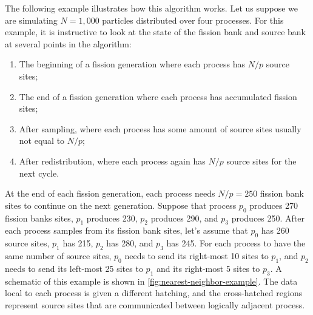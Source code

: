 The following example illustrates how this algorithm works. Let us suppose we
are simulating $N = 1,000$ particles distributed over four processes. For this
example, it is instructive to look at the state of the fission bank and source
bank at several points in the algorithm:
\begin{enumerate}
\item The beginning of a fission generation where each process has $N/p$ source
  sites;
\item The end of a fission generation where each process has accumulated fission
  sites;
\item After sampling, where each process has some amount of source sites usually
  not equal to $N/p$;
\item After redistribution, where each process again has $N/p$ source sites for
  the next cycle.
\end{enumerate}
At the end of each fission generation, each process needs $N/p = 250$ fission
bank sites to continue on the next generation. Suppose that process $p_0$
produces 270 fission banks sites, $p_1$ produces 230, $p_2$ produces 290, and
$p_3$ produces 250. After each process samples from its fission bank sites,
let's assume that $p_0$ has 260 source sites, $p_1$ has 215, $p_2$ has 280, and
$p_3$ has 245. For each process to have the same number of source sites, $p_0$
needs to send its right-most 10 sites to $p_1$, and $p_2$ needs to send its
left-most 25 sites to $p_1$ and its right-most 5 sites to $p_3$. A schematic of
this example is shown in \autoref{fig:nearest-neighbor-example}. The data local
to each process is given a different hatching, and the cross-hatched regions
represent source sites that are communicated between logically adjacent process.
